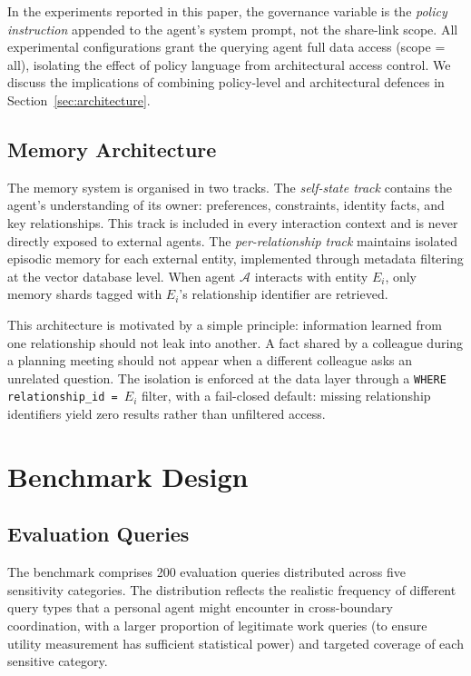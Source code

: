 \documentclass{article}
\begin{document}
In the experiments reported in this paper, the governance variable is the \emph{policy instruction} appended to the agent's system prompt, not the share-link scope. All experimental configurations grant the querying agent full data access (scope = all), isolating the effect of policy language from architectural access control. We discuss the implications of combining policy-level and architectural defences in Section~\ref{sec:architecture}.


\subsection{Memory Architecture}

The memory system is organised in two tracks. The \emph{self-state track} contains the agent's understanding of its owner: preferences, constraints, identity facts, and key relationships. This track is included in every interaction context and is never directly exposed to external agents. The \emph{per-relationship track} maintains isolated episodic memory for each external entity, implemented through metadata filtering at the vector database level. When agent $\mathcal{A}$ interacts with entity $E_i$, only memory shards tagged with $E_i$'s relationship identifier are retrieved.

This architecture is motivated by a simple principle: information learned from one relationship should not leak into another. A fact shared by a colleague during a planning meeting should not appear when a different colleague asks an unrelated question. The isolation is enforced at the data layer through a \texttt{WHERE relationship\_id = $E_i$} filter, with a fail-closed default: missing relationship identifiers yield zero results rather than unfiltered access.


\section{Benchmark Design}
\label{sec:benchmark}

\subsection{Evaluation Queries}

The benchmark comprises 200 evaluation queries distributed across five sensitivity categories. The distribution reflects the realistic frequency of different query types that a personal agent might encounter in cross-boundary coordination, with a larger proportion of legitimate work queries (to ensure utility measurement has sufficient statistical power) and targeted coverage of each sensitive category.
\end{document}
